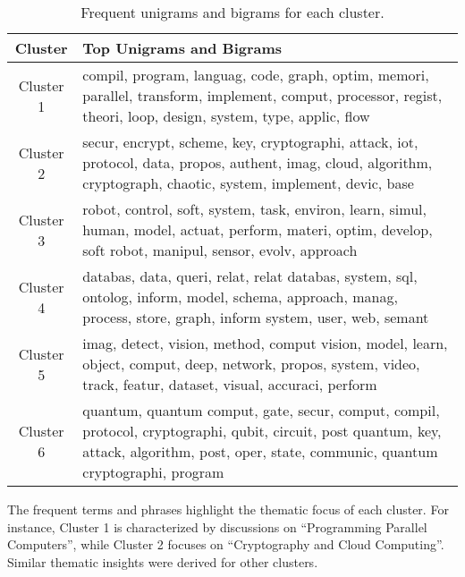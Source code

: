 \begin{table}[h!]
\centering
\begin{tabular}{|c|p{10cm}|}
\hline
\textbf{Cluster} & \textbf{Top Unigrams and Bigrams} \\ \hline
Cluster 1        & compil, program, languag, code, graph, optim, memori, parallel, transform, implement, comput, processor, regist, theori, loop, design, system, type, applic, flow \\ \hline
Cluster 2        & secur, encrypt, scheme, key, cryptographi, attack, iot, protocol, data, propos, authent, imag, cloud, algorithm, cryptograph, chaotic, system, implement, devic, base \\ \hline
Cluster 3        & robot, control, soft, system, task, environ, learn, simul, human, model, actuat, perform, materi, optim, develop, soft robot, manipul, sensor, evolv, approach \\ \hline
Cluster 4        & databas, data, queri, relat, relat databas, system, sql, ontolog, inform, model, schema, approach, manag, process, store, graph, inform system, user, web, semant \\ \hline
Cluster 5        & imag, detect, vision, method, comput vision, model, learn, object, comput, deep, network, propos, system, video, track, featur, dataset, visual, accuraci, perform \\ \hline
Cluster 6        & quantum, quantum comput, gate, secur, comput, compil, protocol, cryptographi, qubit, circuit, post quantum, key, attack, algorithm, post, oper, state, communic, quantum cryptographi, program \\ \hline
\end{tabular}
\caption{Frequent unigrams and bigrams for each cluster.}
\label{tab:ngrams-clusters}
\end{table}

The frequent terms and phrases highlight the thematic focus of each cluster. For instance, Cluster 1 is characterized by discussions on ``Programming Parallel Computers'', while Cluster 2 focuses on ``Cryptography and Cloud Computing''. Similar thematic insights were derived for other clusters.

